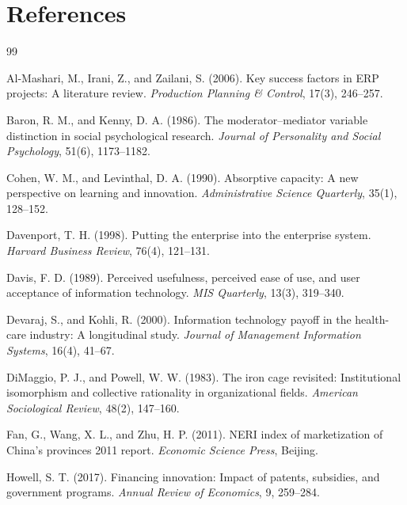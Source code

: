 \documentclass[12pt]{article}
\begin{document}
\section*{References}

\begin{thebibliography}{99}

Al-Mashari, M., Irani, Z., and Zailani, S. (2006). Key success factors in ERP projects: A literature review. \textit{Production Planning \& Control}, 17(3), 246--257.

Baron, R. M., and Kenny, D. A. (1986). The moderator–mediator variable distinction in social psychological research. \textit{Journal of Personality and Social Psychology}, 51(6), 1173--1182.

Cohen, W. M., and Levinthal, D. A. (1990). Absorptive capacity: A new perspective on learning and innovation. \textit{Administrative Science Quarterly}, 35(1), 128--152.

Davenport, T. H. (1998). Putting the enterprise into the enterprise system. \textit{Harvard Business Review}, 76(4), 121--131.

Davis, F. D. (1989). Perceived usefulness, perceived ease of use, and user acceptance of information technology. \textit{MIS Quarterly}, 13(3), 319--340.

Devaraj, S., and Kohli, R. (2000). Information technology payoff in the health-care industry: A longitudinal study. \textit{Journal of Management Information Systems}, 16(4), 41--67.

DiMaggio, P. J., and Powell, W. W. (1983). The iron cage revisited: Institutional isomorphism and collective rationality in organizational fields. \textit{American Sociological Review}, 48(2), 147--160.

Fan, G., Wang, X. L., and Zhu, H. P. (2011). NERI index of marketization of China's provinces 2011 report. \textit{Economic Science Press}, Beijing.

Howell, S. T. (2017). Financing innovation: Impact of patents, subsidies, and government programs. \textit{Annual Review of Economics}, 9, 259--284.


\end{thebibliography}
\end{document}
